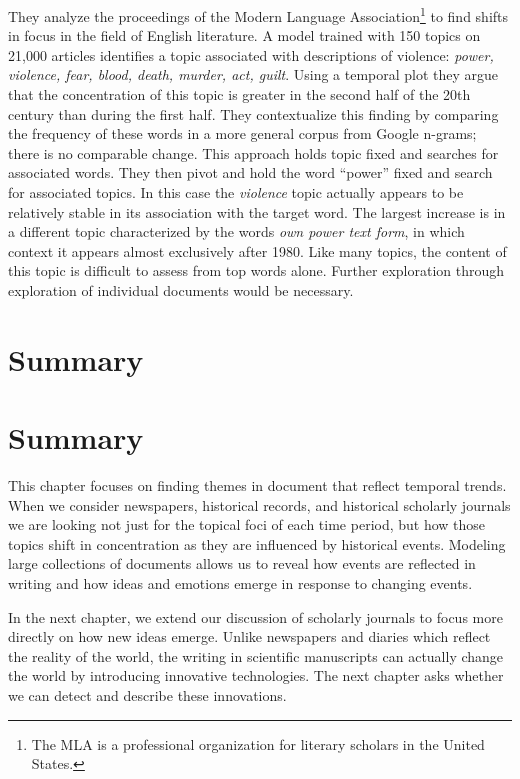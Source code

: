 They analyze the proceedings of the Modern Language Association\footnote{The MLA is a professional organization for literary scholars in the United States.} to find shifts in focus in the field of English literature.
A model trained with 150 topics on 21,000 articles identifies a topic associated with descriptions of violence: {\em power,
violence, fear, blood, death, murder, act, guilt}. Using a temporal plot they argue that the concentration of this topic is greater in the second half of the 20th century than during the first half.
They contextualize this finding by comparing the frequency of these words in a more general corpus from Google n-grams; there is no comparable change.
This approach holds topic fixed and searches for associated words.
They then pivot and hold the word ``power'' fixed and search for associated topics.
In this case the {\em violence} topic actually appears to be relatively stable in its association with the target word. The largest increase is in a different topic characterized by the words {\em own power text form}, in which context it appears almost exclusively after 1980.
Like many topics, the content of this topic is difficult to assess from top words alone.
Further exploration through exploration of individual documents would be necessary.

\section{Summary}

\section{Summary}

This chapter focuses on finding themes in document that reflect temporal trends.
When we consider newspapers, historical records, and historical scholarly journals we are looking not just for the topical foci of each time period, but how those topics shift in concentration as they are influenced by historical events.
Modeling large collections of documents allows us to reveal how events are reflected in writing and how ideas and emotions emerge in response to changing events.

In the next chapter, we extend our discussion of scholarly journals to focus more directly on how new ideas emerge.
Unlike newspapers and diaries which reflect the reality of the world, the writing in scientific manuscripts can actually change the world by introducing innovative technologies.
The next chapter asks whether we can detect and describe these innovations.
